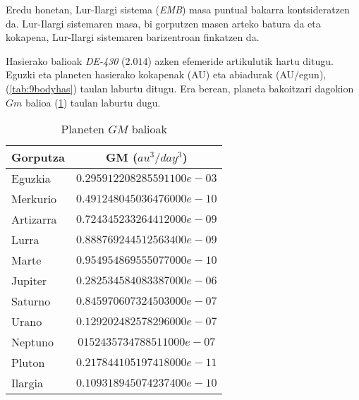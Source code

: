 Eredu honetan, Lur-Ilargi sistema (\emph{EMB}) masa puntual bakarra kontsideratzen da. Lur-Ilargi sistemaren masa, bi gorputzen masen arteko batura da eta kokapena, Lur-Ilargi sistemaren barizentroan finkatzen da.
  
Hasierako balioak \emph{DE-430} ($2.014$) \cite{Folkner2014} azken efemeride artikulutik hartu ditugu. Eguzki eta planeten hasierako kokapenak (AU) eta abiadurak (AU/egun), (\ref{tab:9bodyhas}) taulan laburtu ditugu. Era berean, planeta bakoitzari dagokion $Gm$ balioa (\ref{tab:9bodymas}) taulan laburtu dugu. 

\begin{table}[h]
\caption[Planeten $GM$ balioak]{Planeten $GM$ balioak}
\label{tab:9bodymas}       %
\centering
\begin{tabular}{l c }
\hline 
  Gorputza         &  GM ($au^3/day^3$)          \\
  \hline
  Eguzkia          &  $0.295912208285591100e-03$ \\
  Merkurio         &  $0.491248045036476000e-10$ \\
  Artizarra        &  $0.724345233264412000e-09$ \\
  Lurra            &  $0.888769244512563400e-09$ \\
  Marte            &  $0.954954869555077000e-10$ \\
  Jupiter          &  $0.282534584083387000e-06$ \\
  Saturno          &  $0.845970607324503000e-07$ \\
  Urano            &  $0.129202482578296000e-07$ \\
  Neptuno          &  $0152435734788511000e-07$ \\
  Pluton           &  $0.217844105197418000e-11$ \\
  Ilargia          &  $0.109318945074237400e-10$ \\
\hline
\end{tabular}
\end{table}

